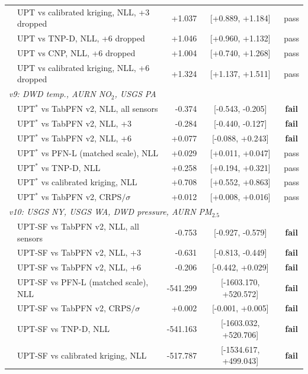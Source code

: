 \begin{table}[h]
\begin{tabular}{llrcc}
 & UPT vs calibrated kriging, NLL, +3 dropped & +1.037 & [+0.889, +1.184] & pass \\
 & UPT vs TNP-D, NLL, +6 dropped & +1.046 & [+0.960, +1.132] & pass \\
 & UPT vs CNP, NLL, +6 dropped & +1.004 & [+0.740, +1.268] & pass \\
 & UPT vs calibrated kriging, NLL, +6 dropped & +1.324 & [+1.137, +1.511] & pass \\
\multicolumn{5}{l}{\emph{v9: DWD temp., AURN NO$_2$, USGS PA}} \\
 & UPT$^\ast$ vs TabPFN v2, NLL, all sensors & -0.374 & [-0.543, -0.205] & \textbf{fail} \\
 & UPT$^\ast$ vs TabPFN v2, NLL, +3 & -0.284 & [-0.440, -0.127] & \textbf{fail} \\
 & UPT$^\ast$ vs TabPFN v2, NLL, +6 & +0.077 & [-0.088, +0.243] & \textbf{fail} \\
 & UPT$^\ast$ vs PFN-L (matched scale), NLL & +0.029 & [+0.011, +0.047] & pass \\
 & UPT$^\ast$ vs TNP-D, NLL & +0.258 & [+0.194, +0.321] & pass \\
 & UPT$^\ast$ vs calibrated kriging, NLL & +0.708 & [+0.552, +0.863] & pass \\
 & UPT$^\ast$ vs TabPFN v2, CRPS$/\sigma$ & +0.012 & [+0.008, +0.016] & pass \\
\multicolumn{5}{l}{\emph{v10: USGS NY, USGS WA, DWD pressure, AURN PM$_{2.5}$}} \\
 & UPT-SF vs TabPFN v2, NLL, all sensors & -0.753 & [-0.927, -0.579] & \textbf{fail} \\
 & UPT-SF vs TabPFN v2, NLL, +3 & -0.631 & [-0.813, -0.449] & \textbf{fail} \\
 & UPT-SF vs TabPFN v2, NLL, +6 & -0.206 & [-0.442, +0.029] & \textbf{fail} \\
 & UPT-SF vs PFN-L (matched scale), NLL & -541.299 & [-1603.170, +520.572] & \textbf{fail} \\
 & UPT-SF vs TabPFN v2, CRPS$/\sigma$ & +0.002 & [-0.001, +0.005] & \textbf{fail} \\
 & UPT-SF vs TNP-D, NLL & -541.163 & [-1603.032, +520.706] & \textbf{fail} \\
 & UPT-SF vs calibrated kriging, NLL & -517.787 & [-1534.617, +499.043] & \textbf{fail} \\
\bottomrule
\end{tabular}
\end{table}